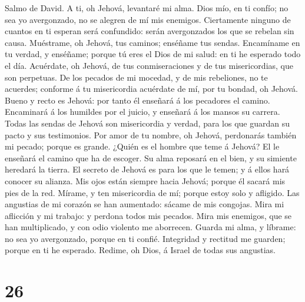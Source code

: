  Salmo de David. A ti, oh Jehová, levantaré mi alma.
 Dios mío, en ti confío; no sea yo avergonzado, no se
alegren de mí mis enemigos.  Ciertamente ninguno de
cuantos en ti esperan será confundido: serán avergonzados los que se
rebelan sin causa.  Muéstrame, oh Jehová, tus caminos;
enséñame tus sendas.  Encamíname en tu verdad, y enséñame;
porque tú eres el Dios de mi salud: en ti he esperado todo el día.
 Acuérdate, oh Jehová, de tus conmiseraciones y de tus
misericordias, que son perpetuas.  De los pecados de mi
mocedad, y de mis rebeliones, no te acuerdes; conforme á tu misericordia
acuérdate de mí, por tu bondad, oh Jehová.  Bueno y recto
es Jehová: por tanto él enseñará á los pecadores el camino.
 Encaminará á los humildes por el juicio, y enseñará á los
mansos su carrera.  Todas las sendas de Jehová son
misericordia y verdad, para los que guardan su pacto y sus testimonios.
 Por amor de tu nombre, oh Jehová, perdonarás también mi
pecado; porque es grande.  ¿Quién es el hombre que teme á
Jehová? El le enseñará el camino que ha de escoger.  Su
alma reposará en el bien, y su simiente heredará la tierra.
 El secreto de Jehová es para los que le temen; y á ellos
hará conocer su alianza.  Mis ojos están siempre hacia
Jehová; porque él sacará mis pies de la red.  Mírame, y
ten misericordia de mí; porque estoy solo y afligido. 
Las angustias de mi corazón se han aumentado: sácame de mis congojas.
 Mira mi aflicción y mi trabajo: y perdona todos mis
pecados.  Mira mis enemigos, que se han multiplicado, y
con odio violento me aborrecen.  Guarda mi alma, y
líbrame: no sea yo avergonzado, porque en ti confié. 
Integridad y rectitud me guarden; porque en ti he esperado.
 Redime, oh Dios, á Israel de todas sus angustias.

\hypertarget{section-25}{%
\section{26}\label{section-25}}

